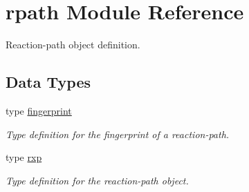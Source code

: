 \hypertarget{namespacerpath}{}\section{rpath Module Reference}
\label{namespacerpath}


Reaction-\/path object definition.  


\subsection*{Data Types}
\begin{DoxyCompactItemize}
\item 
type \mbox{\hyperlink{structrpath_1_1fingerprint}{fingerprint}}
\begin{DoxyCompactList}\small\item\em Type definition for the fingerprint of a reaction-\/path. \end{DoxyCompactList}\item 
type \mbox{\hyperlink{structrpath_1_1rxp}{rxp}}
\begin{DoxyCompactList}\small\item\em Type definition for the reaction-\/path object. \end{DoxyCompactList}\end{DoxyCompactItemize}

